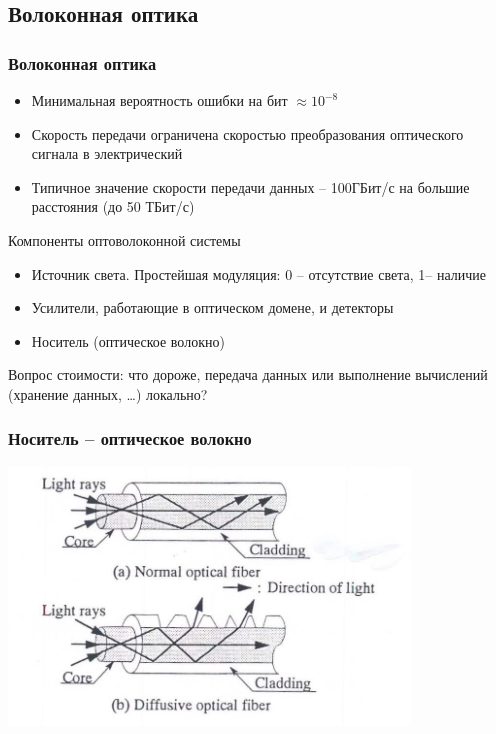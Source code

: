 \documentclass[utf8]{beamer}
\begin{document}
\subsection{Волоконная оптика}
\begin{frame}
\frametitle{Волоконная оптика}
\begin{itemize}
 \item Минимальная вероятность ошибки на бит $\approx10^{-8}$
 \item Скорость передачи ограничена скоростью преобразования оптического сигнала в электрический
 \item Типичное значение скорости передачи данных -- 100ГБит/с на большие расстояния (до 50 ТБит/с)
\end{itemize}
\begin{block}{Компоненты оптоволоконной системы}
\begin{itemize}
 \item Источник света. Простейшая модуляция: 0 -- отсутствие света, 1-- наличие
 \item Усилители, работающие в оптическом домене, и детекторы
 \item Носитель (оптическое волокно)
\end{itemize}
\end{block}
Вопрос стоимости: что дороже, передача данных или выполнение вычислений (хранение данных, \ldots) локально?
\end{frame}
\begin{frame}
\frametitle{Носитель -- оптическое волокно}
\begin{center}
\includegraphics[width=0.8\textwidth]{pics/fiber.png}
\end{center}
\end{frame}
\end{document}

